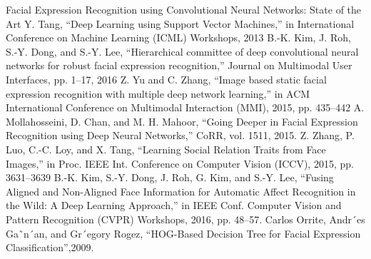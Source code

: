 \begin{enumerate}
 Facial Expression Recognition using Convolutional Neural Networks: State of the Art
Y. Tang, “Deep Learning using Support Vector Machines,” in International Conference on Machine Learning (ICML) Workshops, 2013
B.-K. Kim, J. Roh, S.-Y. Dong, and S.-Y. Lee, “Hierarchical committee
of deep convolutional neural networks for robust facial expression
recognition,” Journal on Multimodal User Interfaces, pp. 1–17, 2016
Z. Yu and C. Zhang, “Image based static facial expression recognition
with multiple deep network learning,” in ACM International Conference
on Multimodal Interaction (MMI), 2015, pp. 435–442
 A. Mollahosseini, D. Chan, and M. H. Mahoor, “Going Deeper in Facial
Expression Recognition using Deep Neural Networks,” CoRR, vol. 1511,
2015.
Z. Zhang, P. Luo, C.-C. Loy, and X. Tang, “Learning Social Relation
Traits from Face Images,” in Proc. IEEE Int. Conference on Computer
Vision (ICCV), 2015, pp. 3631–3639
 B.-K. Kim, S.-Y. Dong, J. Roh, G. Kim, and S.-Y. Lee, “Fusing Aligned
and Non-Aligned Face Information for Automatic Affect Recognition in
the Wild: A Deep Learning Approach,” in IEEE Conf. Computer Vision
and Pattern Recognition (CVPR) Workshops, 2016, pp. 48–57.
 Carlos Orrite, Andr´es Ga˜n´an, and Gr´egory Rogez, “HOG-Based Decision Tree for Facial Expression
Classification”,2009.
\end{enumerate}
